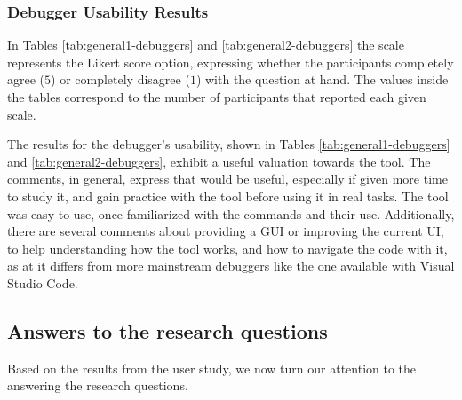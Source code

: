 \subsubsection{Debugger Usability Results}
\label{sec:usability}

In Tables \ref{tab:general1-debuggers} and \ref{tab:general2-debuggers} the scale represents the 
Likert score option, expressing whether the participants completely agree ($5$) or completely disagree 
($1$) with the question at hand. The values inside the tables correspond to the number of participants 
that reported each given scale.

\begin{table}[H]
  \centering
  \caption{General Results Part 1}
  
  \label{tab:general1-debuggers}
\end{table}

\begin{table}[H]
  \centering
  \caption{General Results Part 2}
  
  \label{tab:general2-debuggers}
\end{table}

The results for  the debugger's usability, shown in Tables \ref{tab:general1-debuggers} and 
\ref{tab:general2-debuggers}, exhibit a useful valuation towards the tool. The comments, in general,  
express that \flik would be useful, especially if given more time to study it, and gain practice with the 
tool before using it in real tasks. The tool was easy to use, once familiarized with the commands and 
their use. Additionally, there are several comments about providing a GUI or improving the current UI,
to help understanding how the tool works, and how to navigate the code with it, as at it differs from 
more mainstream debuggers like the one available with Visual Studio Code.


\subsection{Answers to the research questions}
\label{sec:answers}

Based on the results from the user study, we now turn our attention to the answering the research 
questions.

